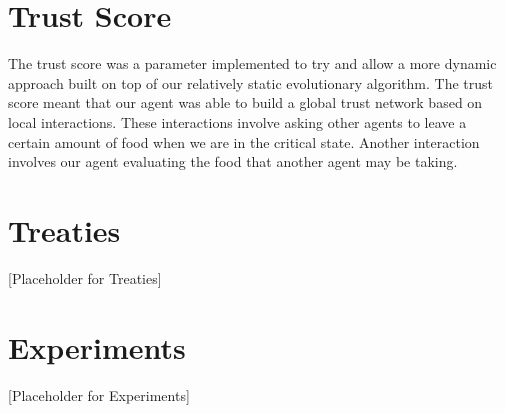 \section{Trust Score}
The trust score was a parameter implemented to try and allow a more dynamic approach built on top of our relatively static evolutionary algorithm.
The trust score meant that our agent was able to build a global trust network based on local interactions. These interactions involve asking other
agents to leave a certain amount of food when we are in the critical state. Another interaction involves our agent evaluating the food that another
agent may be taking.

\section{Treaties}
[Placeholder for Treaties]

\section{Experiments}
[Placeholder for Experiments]
